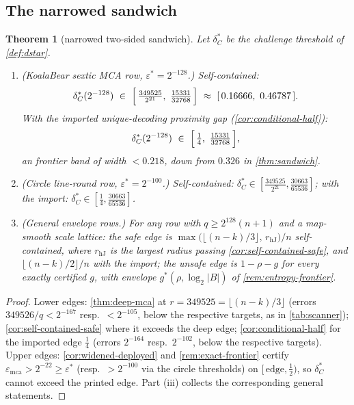 \documentclass[11pt]{article}
\newtheorem{theorem}{Theorem}[section]
\theoremstyle{definition}
\theoremstyle{remark}
\newcommand{\B}{B}
\newcommand{\emca}{\varepsilon_{\mathrm{mca}}}
\begin{document}
\subsection{The narrowed sandwich}\label{sec:pincer-sandwich}

\begin{theorem}[narrowed two-sided sandwich]\label{thm:sandwich2}
Let $\delta^*_C$ be the challenge threshold of \cref{def:dstar}.
\begin{enumerate}[label=\textup{(\roman*)}]
\item \textup{(KoalaBear sextic MCA row, $\varepsilon^*=2^{-128}$.)} Self-contained:
\[
\delta^*_C(2^{-128})\ \in\ \Bigl[\,\tfrac{349525}{2^{21}},\ \tfrac{15331}{32768}\,\Bigr]\ \approx\ [\,0.16666,\ 0.46787\,] .
\]
With the imported unique-decoding proximity gap \textup{(\cref{cor:conditional-half})}:
\[
\delta^*_C(2^{-128})\ \in\ \Bigl[\,\tfrac14,\ \tfrac{15331}{32768}\,\Bigr],
\]
an frontier band of width $<0.218$, down from $0.326$ in \cref{thm:sandwich}.
\item \textup{(Circle line-round row, $\varepsilon^*=2^{-100}$.)} Self-contained: $\delta^*_C\in[\tfrac{349525}{2^{21}},\tfrac{30663}{65536}]$; with the import: $\delta^*_C\in[\tfrac14,\tfrac{30663}{65536}]$.
\item \textup{(General envelope rows.)} For any row with $q\ge2^{128}(n+1)$ and a map-smooth scale lattice: the safe edge is $\max\bigl(\lfloor(n-k)/3\rfloor,\,r_{\mathrm{hJ}}\bigr)/n$ self-contained, where $r_{\mathrm{hJ}}$ is the largest radius passing \cref{cor:self-contained-safe}, and $\lfloor(n-k)/2\rfloor/n$ with the import; the unsafe edge is $1-\rho-g$ for every exactly certified $g$, with envelope $g^*(\rho,\log_2|\B|)$ of \cref{rem:entropy-frontier}.
\end{enumerate}
\end{theorem}

\begin{proof}
Lower edges: \cref{thm:deep-mca} at $r=349525=\lfloor(n-k)/3\rfloor$ (errors $349526/q<2^{-167}$ resp.\ $<2^{-105}$, below the respective targets, as in \cref{tab:scanner}); \cref{cor:self-contained-safe} where it exceeds the deep edge; \cref{cor:conditional-half} for the imported edge $\tfrac14$ (errors $2^{-164}$ resp.\ $2^{-102}$, below the respective targets). Upper edges: \cref{cor:widened-deployed} and \cref{rem:exact-frontier} certify $\emca>2^{-22}\ge\varepsilon^*$ (resp.\ $>2^{-100}$ via the circle thresholds) on $[\,\text{edge},\tfrac12)$, so $\delta^*_C$ cannot exceed the printed edge. Part \textup{(iii)} collects the corresponding general statements.
\end{proof}
\end{document}
